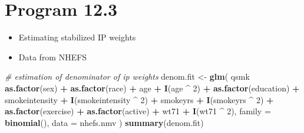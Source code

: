 \documentclass[
  10pt,
]{book}
\newenvironment{Shaded}{\begin{snugshade}}{\end{snugshade}}
\newcommand{\CommentTok}[1]{\textcolor[rgb]{0.56,0.35,0.01}{\textit{#1}}}
\newcommand{\DataTypeTok}[1]{\textcolor[rgb]{0.13,0.29,0.53}{#1}}
\newcommand{\DecValTok}[1]{\textcolor[rgb]{0.00,0.00,0.81}{#1}}
\newcommand{\KeywordTok}[1]{\textcolor[rgb]{0.13,0.29,0.53}{\textbf{#1}}}
\newcommand{\NormalTok}[1]{#1}
\newcommand{\OperatorTok}[1]{\textcolor[rgb]{0.81,0.36,0.00}{\textbf{#1}}}
\newcommand{\StringTok}[1]{\textcolor[rgb]{0.31,0.60,0.02}{#1}}
\providecommand{\tightlist}{%
  \setlength{\itemsep}{0pt}\setlength{\parskip}{0pt}}
\begin{document}
\hypertarget{program-12.3}{%
\section{Program 12.3}\label{program-12.3}}

\begin{itemize}
\tightlist
\item
  Estimating stabilized IP weights
\item
  Data from NHEFS
\end{itemize}

\begin{Shaded}
\begin{Highlighting}[]
\CommentTok{# estimation of denominator of ip weights}
\NormalTok{denom.fit <-}
\StringTok{  }\KeywordTok{glm}\NormalTok{(}
\NormalTok{    qsmk }\OperatorTok{~}\StringTok{ }\KeywordTok{as.factor}\NormalTok{(sex) }\OperatorTok{+}\StringTok{ }\KeywordTok{as.factor}\NormalTok{(race) }\OperatorTok{+}\StringTok{ }\NormalTok{age }\OperatorTok{+}\StringTok{ }\KeywordTok{I}\NormalTok{(age }\OperatorTok{^}\StringTok{ }\DecValTok{2}\NormalTok{) }\OperatorTok{+}
\StringTok{      }\KeywordTok{as.factor}\NormalTok{(education) }\OperatorTok{+}\StringTok{ }\NormalTok{smokeintensity }\OperatorTok{+}
\StringTok{      }\KeywordTok{I}\NormalTok{(smokeintensity }\OperatorTok{^}\StringTok{ }\DecValTok{2}\NormalTok{) }\OperatorTok{+}\StringTok{ }\NormalTok{smokeyrs }\OperatorTok{+}\StringTok{ }\KeywordTok{I}\NormalTok{(smokeyrs }\OperatorTok{^}\StringTok{ }\DecValTok{2}\NormalTok{) }\OperatorTok{+}
\StringTok{      }\KeywordTok{as.factor}\NormalTok{(exercise) }\OperatorTok{+}\StringTok{ }\KeywordTok{as.factor}\NormalTok{(active) }\OperatorTok{+}\StringTok{ }\NormalTok{wt71 }\OperatorTok{+}\StringTok{ }\KeywordTok{I}\NormalTok{(wt71 }\OperatorTok{^}\StringTok{ }\DecValTok{2}\NormalTok{),}
    \DataTypeTok{family =} \KeywordTok{binomial}\NormalTok{(),}
    \DataTypeTok{data =}\NormalTok{ nhefs.nmv}
\NormalTok{  )}
\KeywordTok{summary}\NormalTok{(denom.fit)}
\end{Highlighting}
\end{Shaded}
\end{document}

